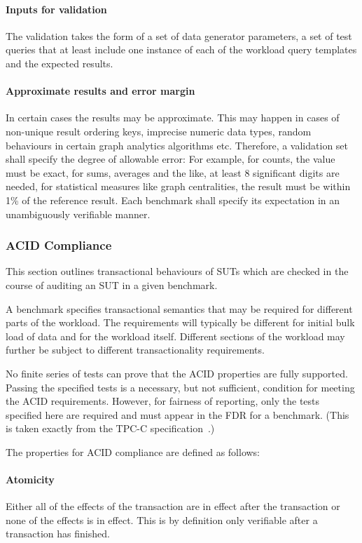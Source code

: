 \paragraph{Inputs for validation}
The validation takes the form of a set of data generator parameters, a set of test queries that at least include one instance of each of the workload query templates and the expected results.

\paragraph{Approximate results and error margin}
In certain cases the results may be approximate. This may happen in cases of non-unique result ordering keys, imprecise numeric data types, random behaviours in certain graph analytics algorithms etc. Therefore, a validation set shall specify the degree of allowable error: For example, for counts, the value must be exact, for sums, averages and the like, at least 8 significant digits are needed, for statistical measures like graph centralities, the result must be within 1\% of the reference result. Each benchmark shall specify its expectation in an unambiguously verifiable manner.


\subsubsection{ACID Compliance}
\label{sec:acid}
This section outlines transactional behaviours of SUTs which are checked in the course of auditing an SUT in a given benchmark.

A benchmark specifies transactional semantics that may be required for different parts of the workload. The requirements will typically be different for initial bulk load of data and for the workload itself. Different sections of the workload may further be subject to different transactionality requirements.

No finite series of tests can prove that the ACID properties are fully supported. Passing the specified tests is a necessary, but not sufficient, condition for meeting the ACID requirements. However, for fairness of reporting, only the tests specified here are required  and  must appear in  the FDR for  a benchmark. (This is taken exactly from the TPC-C specification~\cite{tpcc}.)

The properties for ACID compliance are defined as follows:


\paragraph{Atomicity}
Either all of the effects of the transaction are in effect after the transaction or none of the effects
is in effect. This is by definition only verifiable after a transaction has finished.

